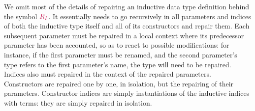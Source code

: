 We omit most of the details of repairing an inductive data type definition
behind the symbol $\textcolor{purple}{R_{I}}$.  It essentially needs to go recursively in all
parameters and indices of both the inductive type itself and all of its
constructors and repair them.  Each subsequent parameter must be repaired in a
local context where its predecessor parameter has been accounted, so as to react
to possible modifications: for instance, if the first parameter must be renamed,
and the second parameter's type refers to the first parameter's name, the type
will need to be repaired.  Indices also must repaired in the context of the
repaired parameters.  Constructors are repaired one by one, in isolation, but
the repairing of their parameters.  Constructor indices are simply
instantiations of the inductive indices with terms: they are simply repaired in
isolation.

